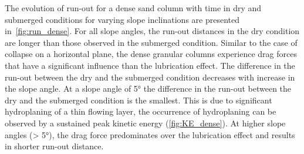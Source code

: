 The evolution of run-out for a dense sand column with time in dry and submerged 
conditions for varying slope inclinations are presented 
in~\cref{fig:run_dense}. For all slope angles, the run-out distances in the dry 
condition are longer than those observed in the submerged condition. Similar to 
the case of collapse on a horizontal plane, the dense granular columns 
experience drag forces that have a significant influence than the lubrication 
effect. The difference in the run-out between the dry and the submerged condition 
decreases with increase in the slope angle. At a slope angle of 5\si{\degree} the 
difference in the run-out between 
the dry and the submerged condition is the smallest. This is due to significant 
hydroplaning of a thin flowing layer, the occurrence of hydroplaning can be 
observed by a sustained peak kinetic energy (\cref{fig:KE_dense}). At 
higher slope angles (> 5\si{\degree}), the drag force predominates over the 
lubrication effect and results in shorter run-out distance. 
